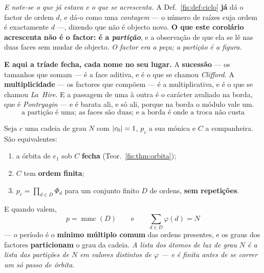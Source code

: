 \documentclass[livro.tex]{subfiles}
\begin{document}

\medskip\noindent\emph{E note-se o que já estava e o que se acrescenta.} A
Def.~\ref{fis:def:ciclo} \textbf{já} dá o factor de ordem $d$, e dá-o como uma
\emph{contagem} --- o número de raízes cuja ordem é exactamente $d$ ---, dizendo
que não é objecto novo. \textbf{O que este corolário acrescenta não é o factor: é a
\emph{partição}}, e a observação de que ela se lê nas duas faces sem mudar de
objecto. \emph{O factor era a peça; a partição é a figura.}

\medskip\noindent\textbf{E aqui a tríade fecha, cada nome no seu lugar.} A
\textbf{sucessão} --- os tamanhos que somam --- é a face aditiva, e é o que se
chamou \emph{Clifford}. A \textbf{multiplicidade} --- os factores que compõem --- é
a multiplicativa, e é o que se chamou \emph{La~Hire}. E a passagem de uma à outra é
o carácter avaliado na borda, que é \emph{Pontryagin} --- e é barata ali, e só ali,
porque na borda o módulo vale um.
\[
\boxed{\;\text{a partição é uma; as faces são duas; e a borda é onde a troca não custa}\;}
\]

\begin{teorema}\label{fis:thm:ciclo}
Seja $c$ uma cadeia de grau $N$ com $\lvert c_0\rvert=1$, $p_c$ a sua mónica e $C$ a
companheira. São equivalentes:
\begin{enumerate}\itemsep3pt
\item[(1)] a órbita de $e_1$ sob $C$ \textbf{fecha} (Teor.~\ref{fis:thm:orbita});
\item[(2)] $C$ tem \textbf{ordem finita};
\item[(3)] $p_c=\prod_{d\in D}\Phi_d$ para um conjunto finito $D$ de ordens,
\textbf{sem repetições}.
\end{enumerate}
E quando valem,
\[
\boxed{\;p=\operatorname{mmc}(D)
\qquad\text{e}\qquad
\sum_{d\in D}\varphi(d)=N\;}
\]
--- o período é o \textbf{mínimo múltiplo comum} das ordens presentes, e os graus
dos factores \textbf{particionam} o grau da cadeia. \emph{A lista dos átomos de
luz de grau $N$ é a lista das partições de $N$ em valores distintos de $\varphi$
--- e é finita antes de se correr um só passo de órbita.}
\end{teorema}
\end{document}
